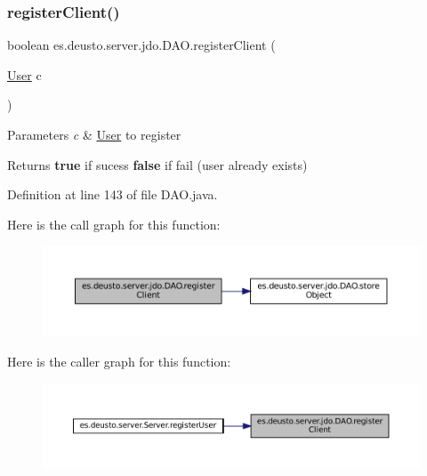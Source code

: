 \subsubsection{\texorpdfstring{registerClient()}{registerClient()}}
{\footnotesize\ttfamily boolean es.\+deusto.\+server.\+jdo.\+D\+A\+O.\+register\+Client (\begin{DoxyParamCaption}\item[{\mbox{\hyperlink{classes_1_1deusto_1_1server_1_1jdo_1_1_user}{User}}}]{c }\end{DoxyParamCaption})}


\begin{DoxyParams}{Parameters}
{\em c} & \mbox{\hyperlink{classes_1_1deusto_1_1server_1_1jdo_1_1_user}{User}} to register \\
\hline
\end{DoxyParams}
\begin{DoxyReturn}{Returns}
{\bfseries{true}} if sucess {\bfseries{false}} if fail (user already exists) 
\end{DoxyReturn}


Definition at line 143 of file D\+A\+O.\+java.

Here is the call graph for this function\+:
\nopagebreak
\begin{figure}[H]
\begin{center}
\leavevmode
\includegraphics[width=350pt]{classes_1_1deusto_1_1server_1_1jdo_1_1_d_a_o_a783758c37658336ee1e4e995a672a0ce_cgraph}
\end{center}
\end{figure}
Here is the caller graph for this function\+:
\nopagebreak
\begin{figure}[H]
\begin{center}
\leavevmode
\includegraphics[width=350pt]{classes_1_1deusto_1_1server_1_1jdo_1_1_d_a_o_a783758c37658336ee1e4e995a672a0ce_icgraph}
\end{center}
\end{figure}
\mbox{\label{classes_1_1deusto_1_1server_1_1jdo_1_1_d_a_o_ac2a137746dce274ba0a89eb388820bcf}} 
